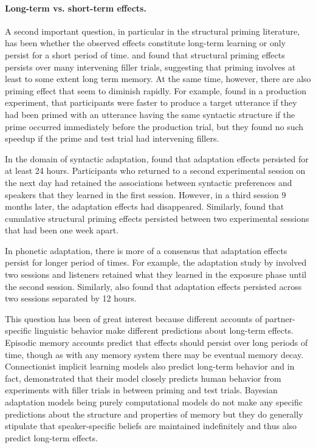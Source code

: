 \paragraph{Long-term vs. short-term effects.} A second important question, in particular in the structural priming literature, has been whether 
the observed effects constitute long-term learning or only persist for a short period of time. \textcite{Bock2000} and \textcite{Bock2007} found
that structural priming effects persists over many intervening filler trials, suggesting that priming involves at least to some extent long term
memory. At the same time, however, there are also priming effect that seem to diminish rapidly. For example, \textcite{Wheeldon2003} found
in a production experiment, that participants were faster to produce a target utterance if they had been primed with an utterance having the same
syntactic structure if the prime occurred immediately before the production trial, but they found no such speedup if the prime and test trial
had intervening fillers.

In the domain of syntactic adaptation, \textcite{Kroczek2017} found that adaptation effects persisted for at least 24 hours. Participants
who returned to a second experimental session on the next day had retained the associations between syntactic preferences and speakers
that they learned in the first session. However, in a third session 9 months later, the adaptation effects had disappeared. Similarly, \textcite{Kaschak2011}
found that cumulative structural priming effects persisted between two experimental sessions that had been one week apart.

In phonetic adaptation, there is more of a consensus that adaptation effects persist for longer period of times. For example, the adaptation study by \textcite{Bradlow2008}
involved two sessions and listeners retained what they learned in the exposure phase until the second session. Similarly, \textcite{Xie2018} also found 
that adaptation effects persisted across two sessions separated by 12 hours.

This question has been of great interest because different accounts of partner-specific linguistic behavior make different predictions about long-term effects.
Episodic memory accounts predict that effects should persist over long periods of time, though as with any memory system there may be eventual memory decay. Connectionist
implicit learning models also predict long-term behavior and in fact, \textcite{Chang2006} demonstrated that their model closely predicts human behavior from experiments with filler trials
in between priming and test trials. Bayesian adaptation models being purely computational models \cite{Marr1982} do not make any specific predictions about the structure and properties of memory
 but they do generally stipulate that speaker-specific beliefs are maintained indefinitely and thus also predict long-term effects.  
 
